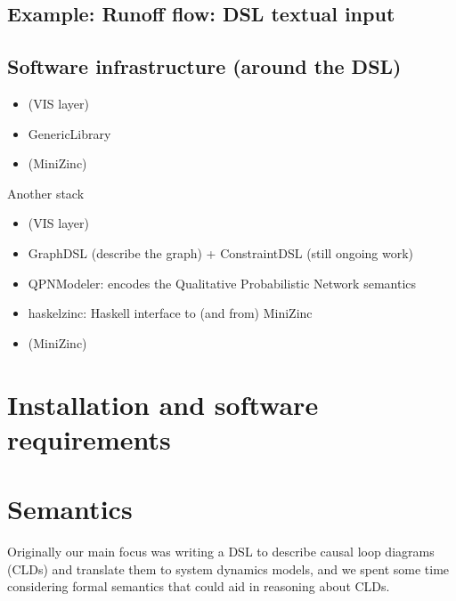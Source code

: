 \documentclass[]{article}
\begin{document}

\subsection{Example: Runoff flow: DSL textual
input}\label{example-runoff-flow-dsl-textual-input}


\subsection{Software infrastructure (around the
DSL)}\label{software-infrastructure-around-the-dsl}



\begin{itemize}
\item
  (VIS layer)
\item
  GenericLibrary
\item
  (MiniZinc)
\end{itemize}
Another stack
\begin{itemize}
\item
  (VIS layer)
\item
  GraphDSL (describe the graph) + ConstraintDSL (still ongoing work)
\item
  QPNModeler: encodes the Qualitative Probabilistic Network semantics
\item
  haskelzinc: Haskell interface to (and from) MiniZinc
\item
  (MiniZinc)
\end{itemize}

\section{Installation and software requirements}
\label{install-script-and-requirements}



\section{Semantics}\label{semantics}
Originally our main focus was writing a DSL to describe causal loop diagrams (CLDs) and
translate them to system dynamics models, and we spent some time considering
formal semantics that could aid in reasoning about CLDs.
\end{document}
